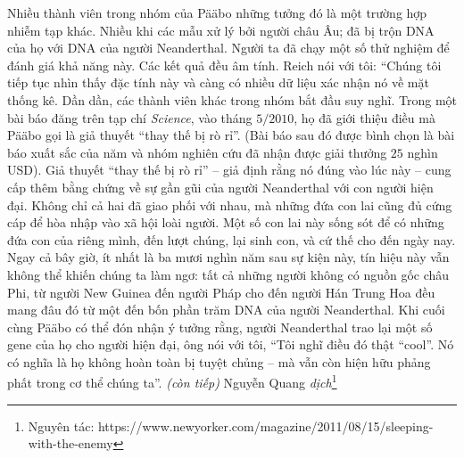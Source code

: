 \begin{multicols}{2}
	\vskip 0.1cm
	Nhiều thành viên trong nhóm của Pääbo những tưởng đó là một trường hợp nhiễm tạp khác. Nhiều khi các mẫu xử lý bởi người châu Âu; đã bị trộn DNA của họ với DNA của người Neanderthal. Người ta đã chạy một số thử nghiệm để đánh giá khả năng này. Các kết quả đều âm tính. Reich nói với tôi: “Chúng tôi tiếp tục nhìn thấy đặc tính này và càng có nhiều dữ liệu xác nhận nó về mặt thống kê. Dần dần, các thành viên khác trong nhóm bắt đầu suy nghĩ. Trong một bài báo đăng trên tạp chí \textit{Science}, vào tháng $5/2010$, họ đã giới thiệu điều mà Pääbo gọi là giả thuyết “thay thế bị rò rỉ”. (Bài báo sau đó được bình chọn là bài báo xuất sắc của năm và nhóm nghiên cứu đã nhận được giải thưởng $25$ nghìn USD).
	\vskip 0.1cm
	Giả thuyết “thay thế bị rò rỉ” -- giả định rằng nó đúng vào lúc này -- cung cấp thêm bằng chứng về sự gần gũi của người Neanderthal với con người hiện đại. Không chỉ cả hai đã giao phối với nhau, mà những đứa con lai cũng đủ cứng cáp để hòa nhập vào xã hội loài người. Một số con lai này sống sót để có những đứa con của riêng mình, đến lượt chúng, lại sinh con, và cứ thế cho đến ngày nay. Ngay cả bây giờ, ít nhất là ba mươi nghìn năm sau sự kiện này, tín hiệu này vẫn không thể khiến chúng ta làm ngơ: tất cả những người không có nguồn gốc châu Phi, từ người New Guinea đến người Pháp cho đến người Hán Trung Hoa đều mang đâu đó từ một đến bốn phần trăm DNA của người Neanderthal.
	\vskip 0.1cm
	Khi cuối cùng Pääbo có thể đón nhận ý tưởng rằng, người Neanderthal trao lại một số gene của họ cho người hiện đại, ông nói với tôi, “Tôi nghĩ điều đó thật “cool”. Nó có nghĩa là họ không hoàn toàn bị tuyệt chủng -- mà vẫn còn hiện hữu phảng phất trong cơ thể chúng ta”. 
	\vskip 0.1cm
	\hfill\textit{(còn tiếp)}
	\vskip 0.1cm
	\hfill Nguyễn Quang \textit{dịch}\footnote[2]{\color{timhieukhoahoc} Nguyên tác: https://www.newyorker.com/magazine/2011/08/15/sleeping-with-the-enemy}
\end{multicols}



